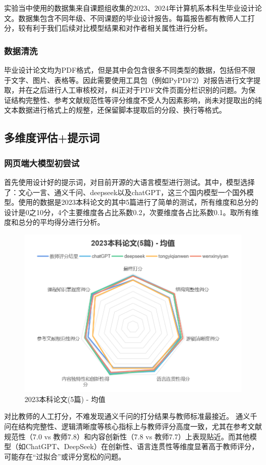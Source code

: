 \documentclass{article}
\begin{document}
实验当中使用的数据集来自课题组收集的2023、2024年计算机系本科生毕业设计论文。数据集包含不同年级、不同课题的毕业设计报告。每篇报告都有教师人工打分，较有利于我们后续对比模型结果和对作者相关属性进行分析。

\subsubsection{数据清洗}

毕业设计论文均为PDF格式，但是其中会包含很多不同类型的数据，包括但不限于文字、图片、表格等。因此需要使用工具包（例如PyPDF2）对报告进行文字提取，并在之后进行人工审核校对，纠正对于PDF文件页面分栏识别的问题。为保证结构完整性、参考文献规范性等评分维度不受人为因素影响，尚未对提取出的纯文本数据进行格式上的规整，还保留脚本提取后的分段、换行等格式。

\subsection{多维度评估+提示词}

\subsubsection{网页端大模型初尝试}

首先使用设计好的提示词，对目前开源的大语言模型进行测试。其中，模型选择了：文心一言、通义千问、deepseek以及chatGPT，这三个国内模型一个国外模型。使用的数据是2023本科论文的其中5篇进行了简单的测试，所有维度和总分的设计是0之10分，4个主要维度各占比系数0.2，次要维度各占比系数0.1。取所有维度和总分的平均得分进行分析。

\begin{figure}
    \centering
    \includegraphics[width=0.5\linewidth]{img/2023(5)-webui-average.png}
    \caption{2023本科论文(5篇) - 均值}
    \label{fig:webui-2023(5)-average}
\end{figure}

对比教师的人工打分，不难发现通义千问的打分结果与教师标准最接近。 通义千问在结构完整性、逻辑清晰度等核心指标上与教师评分高度一致，尤其在参考文献规范性（7.0 vs 教师7.8）和内容创新性（7.8 vs 教师7.7）上表现贴近。而其他模型（如ChatGPT、DeepSeek）在创新性、语言连贯性等维度显著高于教师评分，可能存在“过拟合”或评分宽松的问题。 
\end{document}
